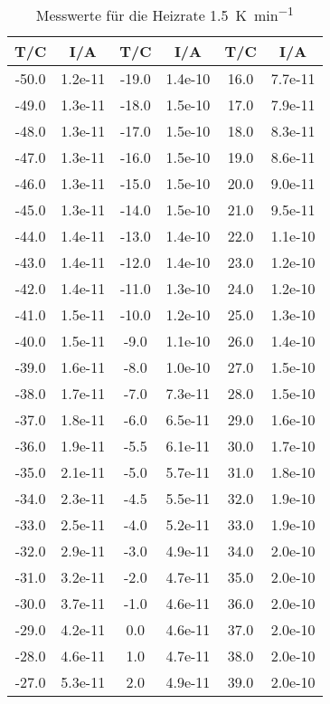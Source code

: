 \begin{table}[h!]
  \centering
  \caption{Messwerte für die Heizrate \SI{1.5}{\kelvin\per\minute}}
\begin{tabular}{cc|cc|cc}
        T/C & I/A &T/C  & I/A &T/C & I/A \\
\midrule
 -50.0 &  1.2e-11 & -19.0 & 1.4e-10 & 16.0 &  7.7e-11 \\
 -49.0 &  1.3e-11 & -18.0 & 1.5e-10 & 17.0 &  7.9e-11 \\
 -48.0 & 1.3e-11 &  -17.0 & 1.5e-10 & 18.0 &  8.3e-11 \\
 -47.0 & 1.3e-11 &  -16.0 & 1.5e-10 & 19.0 &  8.6e-11 \\
 -46.0 & 1.3e-11 &  -15.0 & 1.5e-10 & 20.0 &  9.0e-11 \\
 -45.0 & 1.3e-11 &  -14.0 & 1.5e-10 & 21.0 &  9.5e-11 \\
 -44.0 & 1.4e-11 &  -13.0 & 1.4e-10 & 22.0 &  1.1e-10 \\
 -43.0 & 1.4e-11 &  -12.0 & 1.4e-10 & 23.0 &  1.2e-10 \\
 -42.0 & 1.4e-11 &  -11.0 & 1.3e-10 & 24.0 &  1.2e-10 \\
 -41.0 & 1.5e-11 &  -10.0 & 1.2e-10 & 25.0 &  1.3e-10 \\
 -40.0 & 1.5e-11 &   -9.0 & 1.1e-10 & 26.0 &  1.4e-10 \\
 -39.0 & 1.6e-11 &   -8.0 & 1.0e-10 & 27.0 &  1.5e-10 \\
 -38.0 & 1.7e-11 &   -7.0 & 7.3e-11 & 28.0 &  1.5e-10 \\
 -37.0 & 1.8e-11 &   -6.0 & 6.5e-11 & 29.0 &  1.6e-10 \\
 -36.0 & 1.9e-11 &   -5.5 & 6.1e-11 & 30.0 &  1.7e-10 \\
 -35.0 & 2.1e-11 &   -5.0 & 5.7e-11 & 31.0 &  1.8e-10 \\
 -34.0 & 2.3e-11 &   -4.5 & 5.5e-11 & 32.0 &   1.9e-10 \\
 -33.0 & 2.5e-11 &   -4.0 & 5.2e-11 & 33.0 &   1.9e-10\\
 -32.0 & 2.9e-11 &   -3.0 & 4.9e-11 & 34.0 &  2.0e-10 \\
 -31.0 & 3.2e-11 &   -2.0 & 4.7e-11 & 35.0 &  2.0e-10 \\
 -30.0 & 3.7e-11 &   -1.0 & 4.6e-11 & 36.0 &  2.0e-10 \\
 -29.0 & 4.2e-11 &    0.0 & 4.6e-11 & 37.0 &  2.0e-10 \\
 -28.0 & 4.6e-11 &    1.0 & 4.7e-11 & 38.0 &  2.0e-10 \\
 -27.0 & 5.3e-11 &    2.0 & 4.9e-11 & 39.0 &  2.0e-10 \\

\end{tabular}
\end{table}
